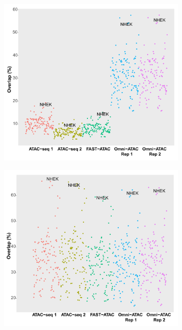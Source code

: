 \begin{figure}[htbp]
\centering
\begin{subfigure}{0.5\textwidth}
\centering
\includegraphics[width=\textwidth]{./Results1/pdfs/ENCODE_125_cell_types_overlap_FAST_ATAC_Omni_ATAC_pval_2}
\caption{\textbf{}}
\end{subfigure}%
\begin{subfigure}{0.5\textwidth}
\centering
\includegraphics[width=\textwidth]{./Results1/pdfs/ENCODE_125_cell_types_overlap_FAST_ATAC_Omni_ATAC_qval_2}

\end{subfigure}
\end{figure}
